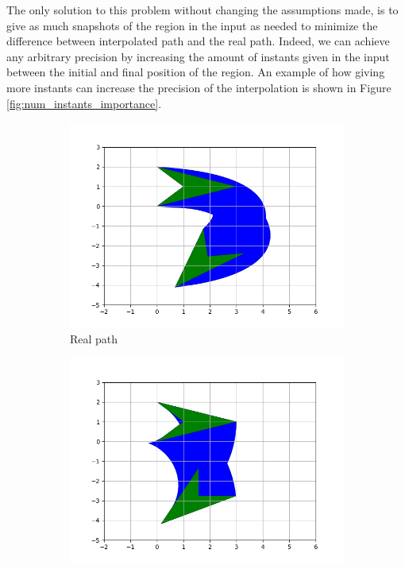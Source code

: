 The only solution to this problem without changing the assumptions made, is to give as much snapshots of the region in the input as needed to minimize the difference between interpolated path and the real path. Indeed, we can achieve any arbitrary precision by increasing the amount of instants given in the input between the initial and final position of the region. An example of how giving more instants can increase the precision of the interpolation is shown in Figure \ref{fig:num_instants_importance}. \\

\begin{figure}[h!]
\centering
\begin{subfigure}{.475\textwidth}
  \centering
  \includegraphics[width=\textwidth]{images/path_real.png}
  \caption{Real path}
  \label{fig:real_path}
\end{subfigure}
\hfill
\begin{subfigure}{.475\textwidth}
  \centering
  \includegraphics[width=\textwidth]{images/path_no_instants.png}

\end{subfigure}
\end{figure}
